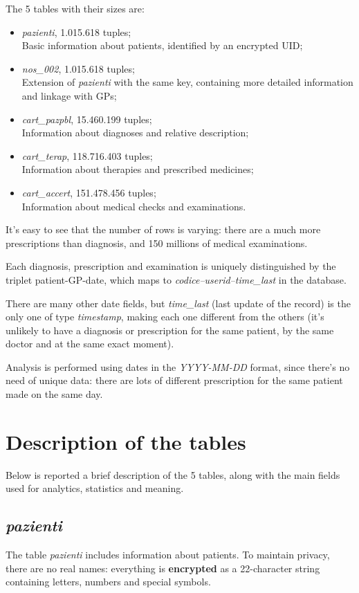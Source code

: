 The 5 tables with their sizes are:
\begin{itemize}
	\item \textit{pazienti}, 1.015.618 tuples; \\
	Basic information about patients, identified by an encrypted UID;
	\item \textit{nos\_002}, 1.015.618 tuples; \\
	Extension of \textit{pazienti} with the same key, containing more detailed information and linkage with GPs;
	\item \textit{cart\_pazpbl}, 15.460.199 tuples; \\
	Information about diagnoses and relative description;
	\item \textit{cart\_terap}, 118.716.403 tuples; \\
	Information about therapies and prescribed medicines;
	\item \textit{cart\_accert}, 151.478.456 tuples; \\
	Information about medical checks and examinations.
\end{itemize}

It's easy to see that the number of rows is varying: there are a much more prescriptions than diagnosis, and 150 millions of medical examinations. 

Each diagnosis, prescription and examination is uniquely distinguished by the triplet patient-GP-date, which maps to \textit{codice--userid--time\_last} in the database. 

There are many other date fields, but \textit{time\_last} (last update of the record) is the only one of type \textit{timestamp}, making each one different from the others (it's unlikely to have a diagnosis or prescription for the same patient, by the same doctor and at the same exact moment). 

Analysis is performed using dates in the \textit{YYYY-MM-DD} format, since there's no need of unique data: there are lots of different prescription for the same patient made on the same day.

\section{Description of the tables}
Below is reported a brief description of the 5 tables, along with the main fields used for analytics, statistics and meaning.

\subsection{\textit{pazienti}}
The table \textit{pazienti} includes information about patients. To maintain privacy, there are no real names: everything is \textbf{encrypted} as a 22-character string containing letters, numbers and special symbols.

